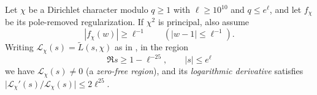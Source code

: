 \begin{lemma}
\label{lem:zero-free-region}
\emitthmsource
Let $\chi$ be a Dirichlet character modulo $q\ge1$ with $\ell\ge10^{10}$ and $q\le e^\ell$, and let $f_\chi$ be its pole-removed regularization. If $\chi^2$ is principal, also assume
\[
 |f_\chi(w)|\ge\ell^{-1}\qquad (|w-1|\le\ell^{-1}).
\]
Writing $\mathcal L_\chi(s)=\widetilde L(s,\chi)$ as in , in the region
\[
 \Re s\ge 1-\ell^{-25},\qquad |s|\le e^\ell
\]
we have $\mathcal L_\chi(s)\ne0$ (a \emph{zero-free region}), and its \emph{logarithmic derivative} satisfies $\bigl|\mathcal L_\chi'(s)/\mathcal L_\chi(s)\bigr|\le2\ell^{25}$.
\end{lemma}

